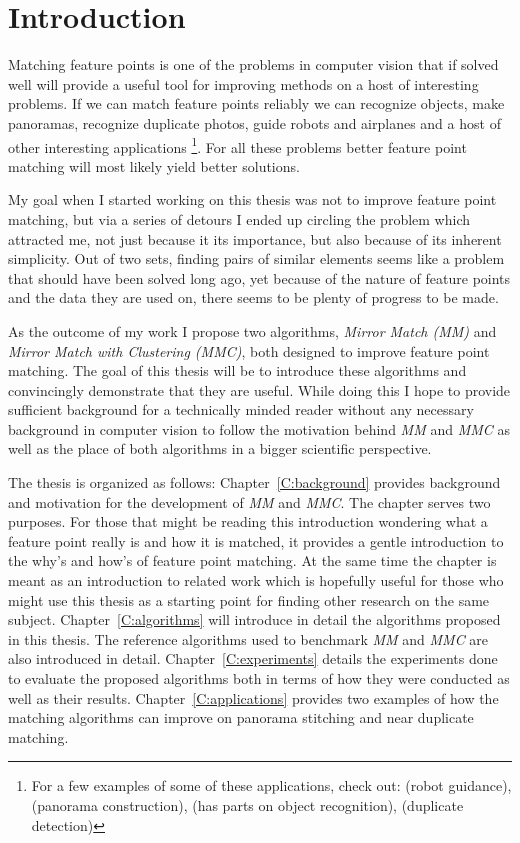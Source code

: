 \chapter*{Introduction}
Matching feature points is one of the problems in computer vision that 
if solved well will provide a useful tool for improving methods on a 
host of interesting problems. If we can match feature points reliably we 
can recognize objects, make panoramas, recognize duplicate photos, guide 
robots and airplanes and a host of other interesting applications 
\footnote{For a few examples of some of these applications, check out: 
\cite{se2002global} (robot guidance), \cite{brown2007automatic} 
(panorama construction), \cite{lowe2004sift} (has parts on object 
recognition), \cite{chu2010consumer} (duplicate detection)}.  For all 
these problems better feature point matching will most likely yield 
better solutions.

My goal when I started working on this thesis was not to improve feature 
point matching, but via a series of detours I ended up circling the 
problem which attracted me, not just because it its importance, but also 
because of its inherent simplicity. Out of two sets, finding pairs of 
similar elements seems like a problem that should have been solved long 
ago, yet because of the nature of feature points and the data they are 
used on, there seems to be plenty of progress to be made.

As the outcome of my work  I propose two algorithms, \emph{Mirror Match 
(MM)} and \emph{Mirror Match with Clustering (MMC)}, both designed to 
improve feature point matching. The goal of this thesis will be to 
introduce these algorithms and convincingly demonstrate that they are 
useful. While doing this I hope to provide sufficient background for a 
technically minded reader without any necessary background in computer 
vision to follow the motivation behind \emph{MM} and \emph{MMC} as well 
as the place of both algorithms in a bigger scientific perspective.
 
The thesis is organized as follows: Chapter~\ref{C:background} provides 
background and motivation for the development of \emph{MM} and 
\emph{MMC}. The chapter serves two purposes.  For those that might be 
reading this introduction wondering what a feature point really is and 
how it is matched, it provides a gentle introduction to the why's and 
how's of feature point matching. At the same time the chapter is meant 
as an introduction to related work which is hopefully useful for those 
who might use this thesis as a starting point for finding other research 
on the same subject. Chapter~\ref{C:algorithms} will introduce in detail 
the algorithms proposed in this thesis. The reference algorithms used to 
benchmark \emph{MM} and \emph{MMC} are also introduced in detail.  
Chapter~\ref{C:experiments} details the experiments done to evaluate the 
proposed algorithms both in terms of how they were conducted as well as 
their results. Chapter~\ref{C:applications} provides two examples of how 
the matching algorithms can improve on panorama stitching and near 
duplicate matching.

